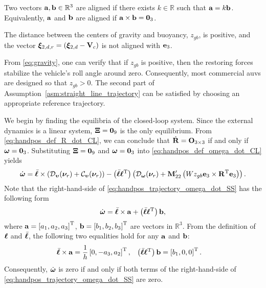 \begin{dfn}
    Two vectors $\mathbf{a}, \mathbf{b} \in \mathbb{R}^3$ are aligned if there exists $k \in \mathbb{R}$ such that $\mathbf{a} = k\mathbf{b}$.
    Equivalently, $\mathbf{a}$ and $\mathbf{b}$ are aligned if $\mathbf{a} \times \mathbf{b} = \mathbf{0}_3$.
    \label{dfn:aligned}
\end{dfn}
\begin{asm}
    The distance between the centers of gravity and buoyancy, $z_{gb}$, is positive, and the vector $\bm{\xi}_{2, d, r} = (\bm{\xi}_{2, d} - \mathbf{V}_c)$ is not aligned with $\mathbf{e}_3$.
    \label{asm:straight_line_trajectory}
\end{asm}
\begin{rmk*}
    From \eqref{eq:gravity}, one can verify that if $z_{gb}$ is positive, then the restoring forces stabilize the vehicle's roll angle around zero.
    Consequently, most commercial \glspl{auv} are designed so that $z_{gb} > 0$.
    The second part of Assumption~\ref{asm:straight_line_trajectory} can be satisfied by choosing an appropriate reference trajectory.
\end{rmk*}

We begin by finding the equilibria of the closed-loop system.
Since the external dynamics is a linear system, $\bm{\Xi} = \mathbf{0}_9$ is the only equilibrium.
From \eqref{eq:handpos_def_R_dot_CL}, we can conclude that $\dot{\mathbf{R}} = \mathbf{O}_{3 \times 3}$ if and only if $\bm{\omega} = \mathbf{0}_3$.
Substituting $\bm{\Xi} = \mathbf{0}_9$ and $\bm{\omega} = \mathbf{0}_3$ into \eqref{eq:handpos_def_omega_dot_CL} yields
\begin{equation}
        \dot{\bm{\omega}} = \Bar{\boldsymbol{\ell}} \times \left(\mathcal{D}_{\bm{\upsilon}}(\bm{\nu}_r) + \mathcal{C}_{\bm{\upsilon}}(\bm{\nu}_r)\right) 
        - \left(\Bar{\boldsymbol{\ell}}\boldsymbol{\ell}^{\mathrm{T}}\right) \left(\mathcal{D}_{\bm{\omega}}(\bm{\nu}_r) + \mathbf{M}_{22}^{\prime}\left(Wz_{gb} \mathbf{e}_3 \times \mathbf{R}^{\mathrm{T}} \mathbf{e}_3\right)\right).
    \label{eq:handpos_trajectory_omega_dot_SS}
\end{equation}
Note that the right-hand-side of \eqref{eq:handpos_trajectory_omega_dot_SS} has the following form
\begin{equation}
    \dot{\bm{\omega}} = \Bar{\boldsymbol{\ell}} \times \mathbf{a} + \left(\Bar{\boldsymbol{\ell}}\boldsymbol{\ell}^{\mathrm{T}}\right) \mathbf{b},
\end{equation}
where $\mathbf{a} = \left[a_1, a_2, a_3\right]^{\mathrm{T}}$, $\mathbf{b} = \left[b_1, b_2, b_3\right]^{\mathrm{T}}$ are vectors in $\mathbb{R}^3$.
From the definition of $\boldsymbol{\ell}$ and $\Bar{\boldsymbol{\ell}}$, the following two equalities hold for any $\mathbf{a}$ and $\mathbf{b}$:
\begin{align}
    \Bar{\boldsymbol{\ell}} \times \mathbf{a} &= \frac{1}{h} \left[0, -a_3, a_2\right]^{\mathrm{T}}, &
    \left(\Bar{\boldsymbol{\ell}}\boldsymbol{\ell}^{\mathrm{T}}\right) \mathbf{b} &= \left[b_1, 0, 0\right]^{\mathrm{T}}.
\end{align}
Consequently, $\dot{\bm{\omega}}$ is zero if and only if both terms of the right-hand-side of \eqref{eq:handpos_trajectory_omega_dot_SS} are zero.

